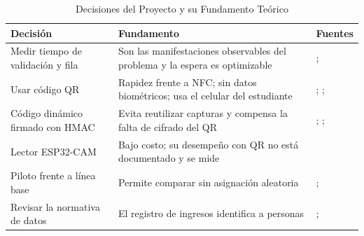 \begin{table}[tbp]
	\caption{Decisiones del Proyecto y su Fundamento Teórico}
	\label{tab:decisiones-marco}
	\begin{tabular}{>{\raggedright\arraybackslash}p{3.3cm}>{\raggedright\arraybackslash}p{5.6cm}>{\raggedright\arraybackslash}p{4.4cm}}
		\toprule
		Decisión                             & Fundamento                                                                  & Fuentes                                                                          \\
		\midrule
		Medir tiempo de validación y fila    & Son las manifestaciones observables del problema y la espera es optimizable & \textcite{torres2019qr}; \textcite{talavera2025espera}                           \\
		Usar código QR                       & Rapidez frente a NFC; sin datos biométricos; usa el celular del estudiante  & \textcite{kao2011physical}; \textcite{harnaningrum2024comparison}; \textcite{rukhiran2023user} \\
		Código dinámico firmado con HMAC     & Evita reutilizar capturas y compensa la falta de cifrado del QR             & \textcite{krawczyk1997hmac}; \textcite{mraihi2011totp}; \textcite{nwabuwe2023dynamicqr} \\
		Lector ESP32-CAM                     & Bajo costo; su desempeño con QR no está documentado y se mide               & \textcite{nowroz2025esp32cam}                                                    \\
		Piloto frente a línea base           & Permite comparar sin asignación aleatoria                                   & \textcite{cranmer2017pretestposttest}; \textcite{campbellstanley1963}            \\
		Revisar la normativa de datos        & El registro de ingresos identifica a personas                               & \textcite{lgpdppso2025}; \textcite{edomex2017datos}                              \\
		\bottomrule
	\end{tabular}
\end{table}
